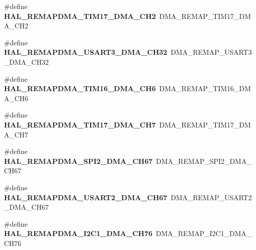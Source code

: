 \begin{DoxyCompactItemize}
\#define {\bfseries H\+A\+L\+\_\+\+R\+E\+M\+A\+P\+D\+M\+A\+\_\+\+T\+I\+M17\+\_\+\+D\+M\+A\+\_\+\+C\+H2}~D\+M\+A\+\_\+\+R\+E\+M\+A\+P\+\_\+\+T\+I\+M17\+\_\+\+D\+M\+A\+\_\+\+C\+H2
\item 
\mbox{\label{group___h_a_l___d_m_a___aliased___defines_ga79d86fdf916efa7463e359ac4a404e29}} 
\#define {\bfseries H\+A\+L\+\_\+\+R\+E\+M\+A\+P\+D\+M\+A\+\_\+\+U\+S\+A\+R\+T3\+\_\+\+D\+M\+A\+\_\+\+C\+H32}~D\+M\+A\+\_\+\+R\+E\+M\+A\+P\+\_\+\+U\+S\+A\+R\+T3\+\_\+\+D\+M\+A\+\_\+\+C\+H32
\item 
\mbox{\label{group___h_a_l___d_m_a___aliased___defines_ga982538686481944a0bb7277321303bee}} 
\#define {\bfseries H\+A\+L\+\_\+\+R\+E\+M\+A\+P\+D\+M\+A\+\_\+\+T\+I\+M16\+\_\+\+D\+M\+A\+\_\+\+C\+H6}~D\+M\+A\+\_\+\+R\+E\+M\+A\+P\+\_\+\+T\+I\+M16\+\_\+\+D\+M\+A\+\_\+\+C\+H6
\item 
\mbox{\label{group___h_a_l___d_m_a___aliased___defines_ga5ff091f7f81537b41fe4bac1d0f7918b}} 
\#define {\bfseries H\+A\+L\+\_\+\+R\+E\+M\+A\+P\+D\+M\+A\+\_\+\+T\+I\+M17\+\_\+\+D\+M\+A\+\_\+\+C\+H7}~D\+M\+A\+\_\+\+R\+E\+M\+A\+P\+\_\+\+T\+I\+M17\+\_\+\+D\+M\+A\+\_\+\+C\+H7
\item 
\mbox{\label{group___h_a_l___d_m_a___aliased___defines_ga6376d9fb648c5df3bbd41746b98cb986}} 
\#define {\bfseries H\+A\+L\+\_\+\+R\+E\+M\+A\+P\+D\+M\+A\+\_\+\+S\+P\+I2\+\_\+\+D\+M\+A\+\_\+\+C\+H67}~D\+M\+A\+\_\+\+R\+E\+M\+A\+P\+\_\+\+S\+P\+I2\+\_\+\+D\+M\+A\+\_\+\+C\+H67
\item 
\mbox{\label{group___h_a_l___d_m_a___aliased___defines_gad932cab9ecf9c8d136b8421d8506a270}} 
\#define {\bfseries H\+A\+L\+\_\+\+R\+E\+M\+A\+P\+D\+M\+A\+\_\+\+U\+S\+A\+R\+T2\+\_\+\+D\+M\+A\+\_\+\+C\+H67}~D\+M\+A\+\_\+\+R\+E\+M\+A\+P\+\_\+\+U\+S\+A\+R\+T2\+\_\+\+D\+M\+A\+\_\+\+C\+H67
\item 
\mbox{\label{group___h_a_l___d_m_a___aliased___defines_gac6bff9249f33d8a00757b024f7a14487}} 
\#define {\bfseries H\+A\+L\+\_\+\+R\+E\+M\+A\+P\+D\+M\+A\+\_\+\+I2\+C1\+\_\+\+D\+M\+A\+\_\+\+C\+H76}~D\+M\+A\+\_\+\+R\+E\+M\+A\+P\+\_\+\+I2\+C1\+\_\+\+D\+M\+A\+\_\+\+C\+H76

\end{DoxyCompactItemize}
